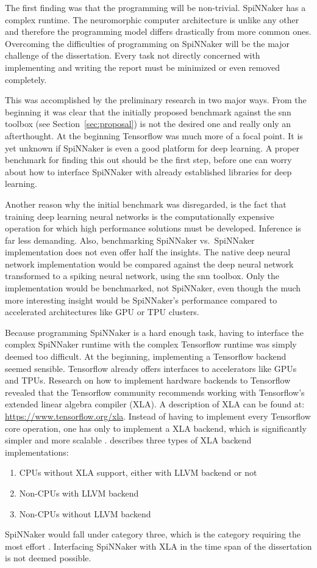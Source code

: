 \documentclass{article}
\begin{document}
The first finding was that the programming will be non-trivial.
SpiNNaker has a complex runtime.
The neuromorphic computer architecture is unlike any other
and therefore the programming model differs drastically
from more common ones.
Overcoming the difficulties of programming on SpiNNaker
will be the major challenge of the dissertation.
Every task not directly concerned with implementing and writing the
report must be minimized or even removed completely.

This was accomplished by the preliminary research in two
major ways.
From the beginning it was clear that the initially
proposed benchmark against the snn toolbox (see
Section~\ref{sec:proposal}) is not the desired one and
really only an afterthought.
At the beginning Tensorflow was much more of a focal point.
It is yet unknown if SpiNNaker is even a good platform for deep
learning.
A proper benchmark for finding this out should be the first step,
before one can worry about how to interface SpiNNaker with
already established libraries for deep learning.

Another reason why the initial benchmark was disregarded, is the fact
that training deep learning neural networks is the computationally
expensive operation for which high performance solutions must be
developed.
Inference is far less demanding.
Also, benchmarking SpiNNaker vs.\ SpiNNaker implementation
does not even offer half the insights.
The native deep neural network implementation would be compared
against the deep neural network transformed to a spiking neural
network, using the snn toolbox.
Only the implementation would be benchmarked, not
SpiNNaker, even though the much more interesting insight
would be SpiNNaker's performance compared to accelerated architectures
like GPU or TPU clusters.

Because programming SpiNNaker is a hard enough task,
having to interface the complex SpiNNaker runtime with the
complex Tensorflow runtime was simply deemed too difficult.
At the beginning, implementing a Tensorflow backend seemed
sensible.
Tensorflow already offers interfaces to accelerators like GPUs and
TPUs.
Research on how to implement hardware backends to
Tensorflow revealed that the Tensorflow community
recommends working with Tensorflow's extended linear
algebra compiler (XLA).
A description of XLA can be found at:
\url{https://www.tensorflow.org/xla}.
Instead of having to implement every Tensorflow core
operation, one has only to implement a XLA backend, which
is significantly simpler and more scalable
\citep{xla_backend}.
\citet{xla_backend} describes three types of XLA backend
implementations:
\begin{enumerate}
  \item CPUs without XLA support, either with LLVM backend
    or not
  \item Non-CPUs with LLVM backend
  \item Non-CPUs without LLVM backend
\end{enumerate}
SpiNNaker would fall under category three, which is the category
requiring the most effort \citep{xla_backend}.
Interfacing SpiNNaker with XLA in the time span of the
dissertation is not deemed possible.
\end{document}
